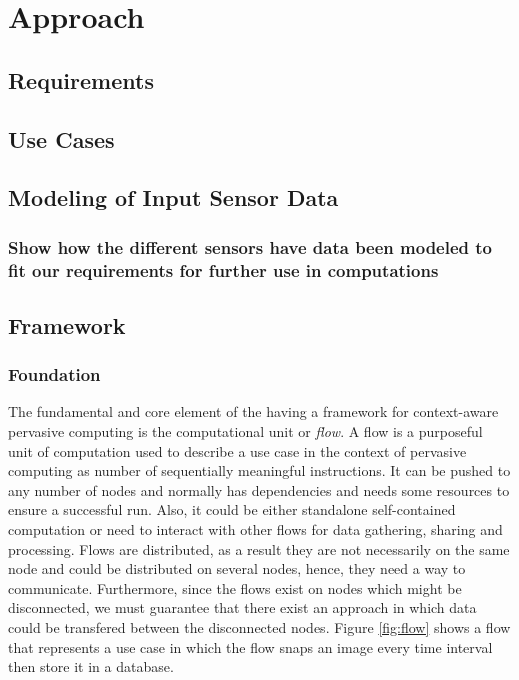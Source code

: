 
\chapter{Approach}\label{chapter:Approach}

\section{Requirements}
\section{Use Cases}
\section{Modeling of Input Sensor Data}
\subsection{Show how the different sensors have data been modeled to fit our requirements for further use in computations}




\newpage

\section{Framework}
\subsection{Foundation}
	The fundamental and core element of the having a framework for context-aware pervasive computing is the computational unit or \textit{flow}. A flow is a purposeful unit of computation used to describe a use case in the context of pervasive computing as number of sequentially meaningful instructions. 
	It can be pushed to any number of nodes and normally has dependencies and needs some resources to ensure a successful run. Also, it could be either standalone self-contained computation or need to interact with other flows for data gathering, sharing and processing. Flows are distributed, as a result they are not necessarily on the same node and could be distributed on several nodes, hence, they need a way to communicate. Furthermore, since the flows exist on nodes which might be disconnected, we must guarantee that there exist an approach in which data could be transfered between the disconnected nodes. Figure \ref{fig:flow} shows a flow that represents a  use case in which the flow snaps an image every time interval then store it in a database.


